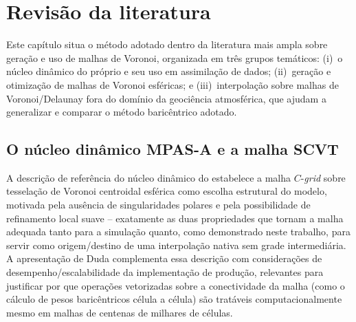 \chapter{Revisão da literatura}
\label{cap:literatura}

Este capítulo situa o método adotado dentro da literatura mais ampla
sobre geração e uso de malhas de Voronoi, organizada em três grupos
temáticos: (i)~o núcleo dinâmico do próprio \mpasa{} e seu uso em
assimilação de dados; (ii)~geração e otimização de malhas de Voronoi
esféricas; e (iii)~interpolação sobre malhas de Voronoi/Delaunay fora do
domínio da geociência atmosférica, que ajudam a generalizar e comparar o
método baricêntrico adotado.

\section{O núcleo dinâmico MPAS-A e a malha SCVT}

A descrição de referência do núcleo dinâmico do \mpasa{}
\cite{skamarock2012voronoi} estabelece a malha $C$-\textit{grid} sobre
tesselação de Voronoi centroidal esférica como escolha estrutural do
modelo, motivada pela ausência de singularidades polares e pela
possibilidade de refinamento local suave -- exatamente as duas
propriedades que tornam a malha adequada tanto para a simulação quanto,
como demonstrado neste trabalho, para servir como origem/destino de uma
interpolação nativa sem grade intermediária. A apresentação de Duda
\cite{duda2014scalability} complementa essa descrição com considerações
de desempenho/escalabilidade da implementação de produção, relevantes
para justificar por que operações vetorizadas sobre a conectividade da
malha (como o cálculo de pesos baricêntricos célula a célula) são
tratáveis computacionalmente mesmo em malhas de centenas de milhares de
células.

